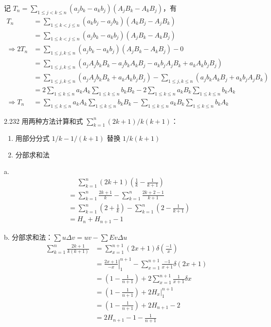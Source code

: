 记 \( T_n = \sum_{1 \leq j < k \leq n} (a_j b_k - a_k b_j) (A_j B_k - A_k B_j) \)，有
\begin{align*}
  T_n &= \sum_{1 \leq k < j \leq n} (a_k b_j - a_j b_k) (A_k B_j - A_j B_k) \\
  &= \sum_{1 \leq k < j \leq n} (a_j b_k - a_k b_j) (A_j B_k - A_k B_j) \\
  \Rightarrow 2 T_n &= \sum_{1 \leq j, k \leq n} (a_j b_k - a_k b_j) (A_j B_k - A_k B_j) - 0 \\
  &= \sum_{1 \leq j, k \leq n} (a_j A_j b_k B_k - a_j b_k A_k B_j - a_k b_j A_j B_k + a_k A_k b_j B_j) \\
  &= \sum_{1 \leq j, k \leq n} (a_j A_j b_k B_k + a_k A_k b_j B_j) - \sum_{1 \leq j, k \leq n} (a_j b_k A_k B_j + a_k b_j A_j B_k) \\
  &= 2 \sum_{1 \leq k \leq n} a_k A_k \sum_{1 \leq k \leq n} b_k B_k - 2 \sum_{1 \leq k \leq n} a_k B_k \sum_{1 \leq k \leq n} b_k A_k \\
  \Rightarrow T_n &= \sum_{1 \leq k \leq n} a_k A_k \sum_{1 \leq k \leq n} b_k B_k - \sum_{1 \leq k \leq n} a_k B_k \sum_{1 \leq k \leq n} b_k A_k
\end{align*}

\begin{problem}{2.23}{2}
  用两种方法计算和式 \( \sum_{k=1}^n (2k + 1) / k (k+1) \)：
  \begin{enumerate}
    \item[a] 用部分分式 \( 1 / k - 1 / (k + 1) \) 替换 \( 1 / k (k + 1) \)
    \item[b] 分部求和法
  \end{enumerate}
\end{problem}

a.
\begin{align*}
  &\phantom{=} \sum_{k=1}^n (2k + 1) (\frac{1}{k} - \frac{1}{k+1}) \\
  &= \sum_{k=1}^n \frac{2k + 1}{k} - \sum_{k=1}^n \frac{2k + 2 - 1}{k+1} \\
  &= \sum_{k=1}^n (2 + \frac{1}{k}) - \sum_{k=1}^n (2 - \frac{1}{k+1}) \\
  &= H_n + H_{n+1} - 1
\end{align*}

b. 分部求和法：\( \sum u \Delta v = uv - \sum Ev \Delta u \)
\begin{align*}
  \sum_{k=1}^n \frac{2k+1}{k(k+1)} &= \sum_{x=1}^{n+1} (2x + 1) \delta (\frac{-1}{x}) \\
  &= \left. \frac{2x + 1}{-x} \right|_1^{n+1} - \sum_{x=1}^{n+1} \frac{-1}{x+1} \delta (2x + 1) \\
  &= (1 - \frac{1}{n+1}) + 2 \sum_{x=1}^{n+1} \frac{1}{x+1} \delta x \\
  &= (1 - \frac{1}{n+1}) + 2 \left. H_x \right|_1^{n+1} \\
  &= (1 - \frac{1}{n+1}) + 2 H_{n+1} - 2 \\
  &= 2 H_{n+1} - 1 - \frac{1}{n+1}
\end{align*}

